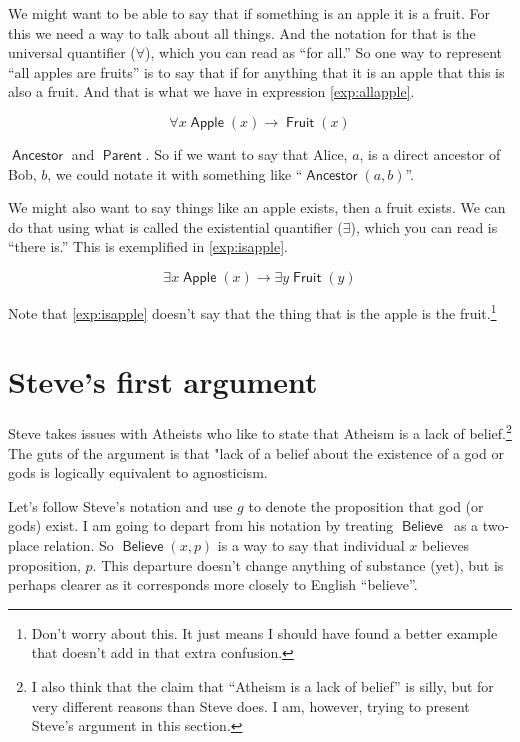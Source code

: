 \documentclass[12pt]{article}
\providecommand{\lif}{\rightarrow}
\providecommand{\lall}{\forall}
\providecommand{\lis}{\exists}
\newcommand{\rel}[1]{\ensuremath{\mathop{\mathsf{#1}}}}
\newcommand{\rlan}{\rel{Ancestor}}
\newcommand{\rlpt}{\rel{Parent}}
\newcommand{\rlapple}{\rel{Apple}}
\newcommand{\rlfruit}{\rel{Fruit}}
\newcommand{\rlbelieve}{\rel{Believe}}
\begin{document}
We might want to be able to say that if something is an apple it is a fruit.
For this we need a way to talk about all things. And the notation for that is the universal quantifier ($\lall$), which you can read as “for all.” So one way to represent “all apples are fruits” is to say that if for anything that it is an apple that this is also a fruit. And that is what we have in expression \ref{exp:allapple}.

\begin{equation}\label{exp:allapple}
    \lall x \rlapple(x) \lif \rlfruit(x)
\end{equation}

$\rlan$ and $\rlpt$. So if we want to say that Alice, $a$, is a direct ancestor of Bob, $b$, we could notate it with something like “$\rlan(a, b)$”.

We might also want to say things like an apple exists, then a fruit exists.
We can do that using what is called the existential quantifier ($\lis$), which you can read is “there is.” This is exemplified in \ref{exp:isapple}.

\begin{equation}\label{exp:isapple}
    \lis x \rlapple(x) \lif \lis y \rlfruit(y)
\end{equation}

Note that \ref{exp:isapple} doesn't say that the thing that is the apple is the fruit.\footnote{Don't worry about this. It just means I should have found a better example that doesn't add in that extra confusion.}

\section{Steve's first argument}

Steve takes issues with Atheists who like to state that Atheism is a lack of belief.\footnote{I also think that the claim that “Atheism is a lack of belief” is silly, but for very different reasons than Steve does. I am, however, trying to present Steve's argument in this section.}
The guts of the argument is that "lack of a belief about the existence of a god or gods is logically equivalent to agnosticism.

Let's follow Steve's notation and use $g$ to denote the proposition that god (or gods) exist.
I am going to depart from his notation by treating \rlbelieve\ as a two-place relation. So $\rlbelieve(x, p)$ is a way to say that individual $x$ believes proposition, $p$. This departure doesn't change anything of substance (yet), but is perhaps clearer as it corresponds more closely to English “believe”.
\end{document}
